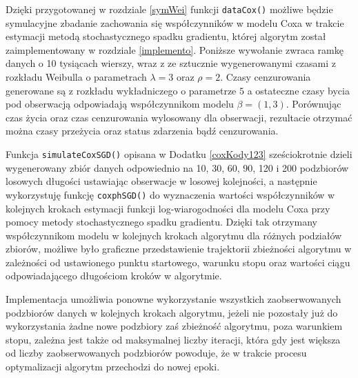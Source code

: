 Dzięki przygotowanej w rozdziale \ref{symWei} funkcji \texttt{dataCox()} możliwe będzie symulacyjne zbadanie zachowania się współczynników w modelu Coxa w trakcie estymacji metodą stochastycznego spadku gradientu, której algorytm został zaimplementowany w rozdziale \ref{implemento}. Poniższe wywołanie zwraca ramkę danych o 10 tysiącach wierszy, wraz z ze sztucznie wygenerowanymi czasami z rozkładu Weibulla o parametrach $\lambda =3$ oraz $\rho =2$. Czasy cenzurowania generowane są z rozkładu wykładniczego o parametrze $5$ a ostateczne czasy bycia pod obserwacją odpowiadają współczynnikom modelu $\beta = (1,3)$. Porównując czas życia oraz czas cenzurowania wylosowany dla obserwacji, rezultacie otrzymać można czasy przeżycia oraz status zdarzenia bądź cenzurowania. 
\begin{Shaded}
\begin{Highlighting}[]
\StringTok{ }\NormalTok{(}\NormalTok{(}\NormalTok{:}\NormalTok{, } \NormalTok{, } \NormalTok{), } \NormalTok{)}
\StringTok{ }\NormalTok{(}\NormalTok{^}\NormalTok{, } \NormalTok{, }  \NormalTok{(}\NormalTok{,}\NormalTok{), } \NormalTok{) }
\end{Highlighting}
\end{Shaded}
Funkcja \texttt{simulateCoxSGD()} opisana w Dodatku \ref{coxKody123} sześciokrotnie dzieli wygenerowany zbiór danych odpowiednio na 10, 30, 60, 90, 120 i 200 podzbiorów losowych długości ustawiając obserwacje w losowej kolejności, a następnie wykorzystuję funkcję \texttt{coxphSGD()} do wyznaczenia wartości współczynników w kolejnych krokach estymacji funkcji log-wiarogodności dla modelu Coxa przy pomocy metody stochastycznego spadku gradientu. Dzięki tak otrzymany współczynnikom modelu w kolejnych krokach algorytmu dla różnych podziałów zbiorów, możliwe było graficzne przedstawienie trajektorii zbieżności algorytmu w zależności od ustawionego punktu startowego, warunku stopu oraz wartości ciągu odpowiadającego długościom kroków w algorytmie. 

Implementacja umożliwia ponowne wykorzystanie wszystkich zaobserwowanych podzbiorów danych w kolejnych krokach algorytmu, jeżeli nie pozostały już do wykorzystania żadne nowe podzbiory zaś zbieżność algorytmu, poza warunkiem stopu, zależna jest także od maksymalnej liczby iteracji, która gdy jest większa od liczby zaobserwowanych podzbiorów powoduje, że w trakcie procesu optymalizacji algorytm przechodzi do nowej epoki. 

